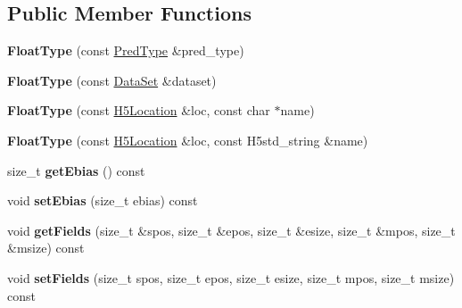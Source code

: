 \subsection*{Public Member Functions}
\begin{DoxyCompactItemize}
\item 
\mbox{\label{class_h5_1_1_float_type_ac815e325b21b3a3d3e829d88c8bc7786}} 
{\bfseries Float\+Type} (const \hyperlink{class_h5_1_1_pred_type}{Pred\+Type} \&pred\+\_\+type)
\item 
\mbox{\label{class_h5_1_1_float_type_a8ca1abd3d0eb51095524d5cc4e23766e}} 
{\bfseries Float\+Type} (const \hyperlink{class_h5_1_1_data_set}{Data\+Set} \&dataset)
\item 
\mbox{\label{class_h5_1_1_float_type_a65c94f3c69964e7d5f0866e5fef9a1b9}} 
{\bfseries Float\+Type} (const \hyperlink{class_h5_1_1_h5_location}{H5\+Location} \&loc, const char $\ast$name)
\item 
\mbox{\label{class_h5_1_1_float_type_a329b5c89a7c1e50838964d94d509bc82}} 
{\bfseries Float\+Type} (const \hyperlink{class_h5_1_1_h5_location}{H5\+Location} \&loc, const H5std\+\_\+string \&name)
\item 
\mbox{\label{class_h5_1_1_float_type_abd95daf11b1947da940c6710a3102142}} 
size\+\_\+t {\bfseries get\+Ebias} () const
\item 
\mbox{\label{class_h5_1_1_float_type_a61c6dd70e87bbd6648859389f0bd6386}} 
void {\bfseries set\+Ebias} (size\+\_\+t ebias) const
\item 
\mbox{\label{class_h5_1_1_float_type_a5b56f78edbcb97232133ac65612cb171}} 
void {\bfseries get\+Fields} (size\+\_\+t \&spos, size\+\_\+t \&epos, size\+\_\+t \&esize, size\+\_\+t \&mpos, size\+\_\+t \&msize) const
\item 
\mbox{\label{class_h5_1_1_float_type_a18cf6ab244d873c5dcd514ef5fb8b24d}} 
void {\bfseries set\+Fields} (size\+\_\+t spos, size\+\_\+t epos, size\+\_\+t esize, size\+\_\+t mpos, size\+\_\+t msize) const
\item 

\end{DoxyCompactItemize}
